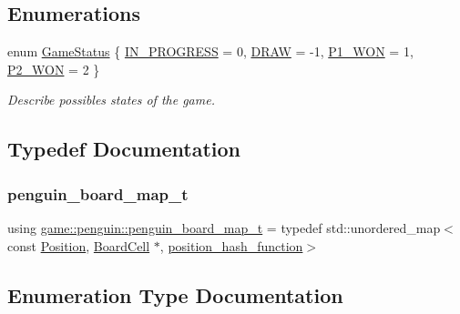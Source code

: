 \subsection*{Enumerations}
\begin{DoxyCompactItemize}
\item 
enum \hyperlink{namespacegame_1_1penguin_abede3b915ccaae3188a174adcfeaaf1f}{Game\+Status} \{ \hyperlink{namespacegame_1_1penguin_abede3b915ccaae3188a174adcfeaaf1fae6b9b95a7357f479db5bc6aeb7095326}{I\+N\+\_\+\+P\+R\+O\+G\+R\+E\+SS} = 0, 
\hyperlink{namespacegame_1_1penguin_abede3b915ccaae3188a174adcfeaaf1fa7e613d06f8efbc14d301845a962b44c4}{D\+R\+AW} = -\/1, 
\hyperlink{namespacegame_1_1penguin_abede3b915ccaae3188a174adcfeaaf1fa09b845adf1c0cc2907b94612181505d6}{P1\+\_\+\+W\+ON} = 1, 
\hyperlink{namespacegame_1_1penguin_abede3b915ccaae3188a174adcfeaaf1fab5231e5293e5a97fc383444a428ab31c}{P2\+\_\+\+W\+ON} = 2
 \}\begin{DoxyCompactList}\small\item\em Describe possibles states of the game. \end{DoxyCompactList}
\end{DoxyCompactItemize}


\subsection{Typedef Documentation}
\mbox{\label{namespacegame_1_1penguin_a6ea7c0fc4c04931bf39fcac439c92735}} 
\subsubsection{\texorpdfstring{penguin\+\_\+board\+\_\+map\+\_\+t}{penguin\_board\_map\_t}}
{\footnotesize\ttfamily using \hyperlink{namespacegame_1_1penguin_a6ea7c0fc4c04931bf39fcac439c92735}{game\+::penguin\+::penguin\+\_\+board\+\_\+map\+\_\+t} = typedef std\+::unordered\+\_\+map$<$const \hyperlink{structgame_1_1_position}{Position}, \hyperlink{classgame_1_1penguin_1_1_board_cell}{Board\+Cell} $\ast$, \hyperlink{structgame_1_1position__hash__function}{position\+\_\+hash\+\_\+function}$>$}



\subsection{Enumeration Type Documentation}
\mbox{\label{namespacegame_1_1penguin_abede3b915ccaae3188a174adcfeaaf1f}} 
